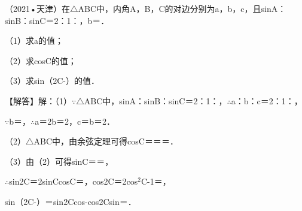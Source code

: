 \begin{question}
（2021•天津）在$\triangle$ABC中，内角A，B，C的对边分别为a，b，c，且sinA：sinB：sinC＝2：1：\allowbreak{}，b＝\allowbreak{}．\par
（1）求a的值；\par
（2）求cosC的值；\par
（3）求sin（2C-\allowbreak{}）的值．\par
\begin{solution}
【解答】解：（1）$\because$$\triangle$ABC中，sinA：sinB：sinC＝2：1：\allowbreak{}，$\therefore$a：b：c＝2：1：\allowbreak{}，\par
$\because$b＝\allowbreak{}，$\therefore$a＝2b＝2\allowbreak{}，c＝\allowbreak{}b＝2．\par
（2）$\triangle$ABC中，由余弦定理可得cosC＝\allowbreak{}＝\allowbreak{}＝\allowbreak{}．\par
（3）由（2）可得sinC＝\allowbreak{}＝\allowbreak{}，\par
$\therefore$sin2C＝2sinCcosC＝\allowbreak{}，cos2C＝2cos$^{2}$C-1＝\allowbreak{}，\par
sin（2C-\allowbreak{}）＝sin2Ccos\allowbreak{}-cos2Csin\allowbreak{}＝\allowbreak{}．\par
\end{solution}
\end{question}

